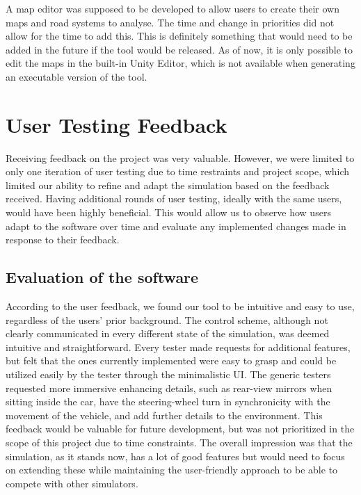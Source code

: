     A map editor was supposed to be developed to allow users to create their own maps and road systems to analyse. The time and change in priorities did not allow for the time to add this. This is definitely something that would need to be added in the future if the tool would be released. As of now, it is only possible to edit the maps in the built-in Unity Editor, which is not available when generating an executable version of the tool.

\section{User Testing Feedback}
    Receiving feedback on the project was very valuable. However, we were limited to only one iteration of user testing due to time restraints and project scope, which limited our ability to refine and adapt the simulation based on the feedback received. Having additional rounds of user testing, ideally with the same users, would have been highly beneficial. This would allow us to observe how users adapt to the software over time and evaluate any implemented changes made in response to their feedback.
    
    \subsection{Evaluation of the software}
        According to the user feedback, we found our tool to be intuitive and easy to use, regardless of the users' prior background. The control scheme, although not clearly communicated in every different state of the simulation, was deemed intuitive and straightforward.  Every tester made requests for additional features, but felt that the ones currently implemented were easy to grasp and could be utilized easily by the tester through the minimalistic UI. The generic testers requested more immersive enhancing details, such as rear-view mirrors when sitting inside the car, have the steering-wheel turn in synchronicity with the movement of the vehicle, and add further details to the environment. This feedback would be valuable for future development, but was not prioritized in the scope of this project due to time constraints. The overall impression was that the simulation, as it stands now, has a lot of good features but would need to focus on extending these while maintaining the user-friendly approach to be able to compete with other simulators.
    

